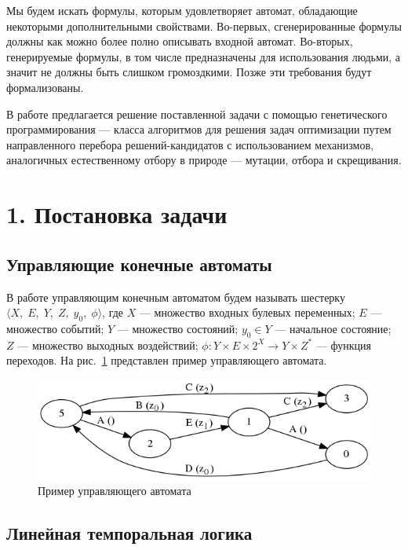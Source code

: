 \documentclass[12pt,fleqn]{article}
\begin{document}
Мы будем искать формулы, которым удовлетворяет автомат, обладающие некоторыми дополнительными свойствами.
Во-первых, сгенерированные формулы должны как можно более полно описывать входной автомат.
Во-вторых, генерируемые формулы, в том числе предназначены для использования людьми, а значит не должны быть слишком громоздкими.
Позже эти требования будут формализованы.

В работе предлагается решение поставленной задачи с помощью генетического программирования --- класса алгоритмов
для решения задач оптимизации путем направленного перебора решений-кандидатов с использованием механизмов, аналогичных естественному
отбору в природе --- мутации, отбора и скрещивания.

\section{1. Постановка задачи}

\subsection{Управляющие конечные автоматы}

В работе управляющим конечным автоматом будем называть шестерку $\langle X,\; E,\; Y,\; Z,\; y_0,\; \phi \rangle$,
где $X$ --- множество входных булевых переменных; $E$ --- множество событий; $Y$ --- множество состояний;
$y_0 \in Y$ --- начальное состояние; $Z$ --- множество выходных воздействий;
$\phi : Y \times E \times 2^X \rightarrow Y \times Z^*$ --- функция переходов. На рис.~\ref{aut} представлен
пример управляющего автомата.

\begin{figure}[!hb]
  \centering
    \includegraphics[scale=0.5]{lift.png}
  \caption{Пример управляющего автомата}
  \label{aut}
\end{figure}

\subsection{Линейная темпоральная логика}
\end{document}
